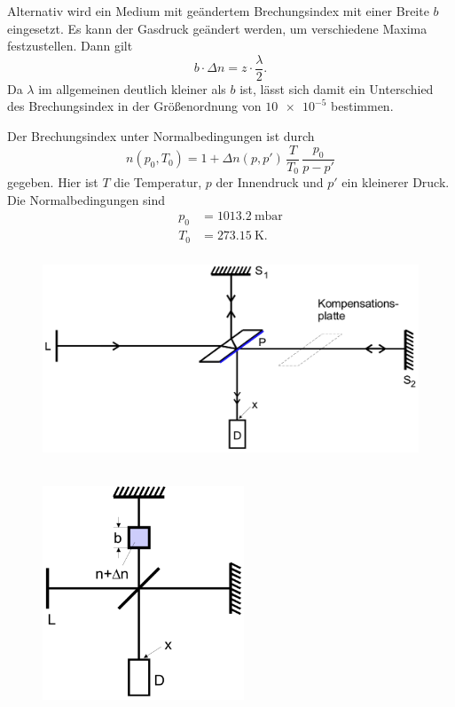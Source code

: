 \noindent Alternativ wird ein Medium mit geändertem Brechungsindex mit einer Breite $b$ eingesetzt. 
Es kann der Gasdruck geändert werden, um verschiedene Maxima 
festzustellen. 
Dann gilt 
\begin{equation}
    b \cdot \Delta n = z \cdot \frac{\lambda}{2}.
    \label{eqn:deltan}
\end{equation}
Da $\lambda$ im allgemeinen deutlich kleiner als $b$ ist, lässt sich damit ein 
Unterschied des Brechungsindex in der Größenordnung von $\num{10e-5}$ bestimmen.

\noindent Der Brechungsindex unter Normalbedingungen ist durch
\begin{equation}
    n(p_0, T_0) = 1 + \Delta n(p,p') \, \frac{T}{T_0} \, \frac{p_0}{p - p'}
    \label{eqn:n}
\end{equation}
gegeben. Hier ist $T$ die Temperatur, $p$ der Innendruck und $p'$ ein kleinerer Druck.
Die Normalbedingungen sind
\begin{align*}
    p_0 &= \SI{1013.2}{\milli\bar} \\
    T_0 &= \SI{273.15}{\kelvin}.
\end{align*}

\begin{figure}
    \centering
    \includegraphics[width=12cm, height=6cm]{build/michelson.png}
    \caption{}
    \label{fig:michelson}
\end{figure}

\begin{figure}
    \centering
    \includegraphics[width=6cm, height=7cm]{build/michelson2.png}
    \caption{}
    \label{fig:michelson2}
\end{figure}

